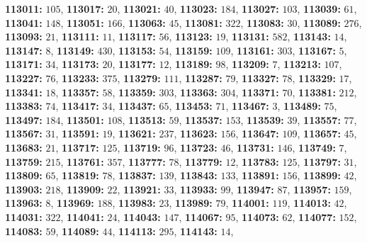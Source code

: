 \textsf{\bfseries 113011:} $105$, \textsf{\bfseries 113017:} $20$, \textsf{\bfseries 113021:} $40$, \textsf{\bfseries 113023:} $184$, \textsf{\bfseries 113027:} $103$, \textsf{\bfseries 113039:} $61$, \textsf{\bfseries 113041:} $148$, \textsf{\bfseries 113051:} $166$, \textsf{\bfseries 113063:} $45$, \textsf{\bfseries 113081:} $322$, \textsf{\bfseries 113083:} $30$, \textsf{\bfseries 113089:} $276$, \textsf{\bfseries 113093:} $21$, \textsf{\bfseries 113111:} $11$, \textsf{\bfseries 113117:} $56$, \textsf{\bfseries 113123:} $19$, \textsf{\bfseries 113131:} $582$, \textsf{\bfseries 113143:} $14$, \textsf{\bfseries 113147:} $8$, \textsf{\bfseries 113149:} $430$, \textsf{\bfseries 113153:} $54$, \textsf{\bfseries 113159:} $109$, \textsf{\bfseries 113161:} $303$, \textsf{\bfseries 113167:} $5$, \textsf{\bfseries 113171:} $34$, \textsf{\bfseries 113173:} $20$, \textsf{\bfseries 113177:} $12$, \textsf{\bfseries 113189:} $98$, \textsf{\bfseries 113209:} $7$, \textsf{\bfseries 113213:} $107$, \textsf{\bfseries 113227:} $76$, \textsf{\bfseries 113233:} $375$, \textsf{\bfseries 113279:} $111$, \textsf{\bfseries 113287:} $79$, \textsf{\bfseries 113327:} $78$, \textsf{\bfseries 113329:} $17$, \textsf{\bfseries 113341:} $18$, \textsf{\bfseries 113357:} $58$, \textsf{\bfseries 113359:} $303$, \textsf{\bfseries 113363:} $304$, \textsf{\bfseries 113371:} $70$, \textsf{\bfseries 113381:} $212$, \textsf{\bfseries 113383:} $74$, \textsf{\bfseries 113417:} $34$, \textsf{\bfseries 113437:} $65$, \textsf{\bfseries 113453:} $71$, \textsf{\bfseries 113467:} $3$, \textsf{\bfseries 113489:} $75$, \textsf{\bfseries 113497:} $184$, \textsf{\bfseries 113501:} $108$, \textsf{\bfseries 113513:} $59$, \textsf{\bfseries 113537:} $153$, \textsf{\bfseries 113539:} $39$, \textsf{\bfseries 113557:} $77$, \textsf{\bfseries 113567:} $31$, \textsf{\bfseries 113591:} $19$, \textsf{\bfseries 113621:} $237$, \textsf{\bfseries 113623:} $156$, \textsf{\bfseries 113647:} $109$, \textsf{\bfseries 113657:} $45$, \textsf{\bfseries 113683:} $21$, \textsf{\bfseries 113717:} $125$, \textsf{\bfseries 113719:} $96$, \textsf{\bfseries 113723:} $46$, \textsf{\bfseries 113731:} $146$, \textsf{\bfseries 113749:} $7$, \textsf{\bfseries 113759:} $215$, \textsf{\bfseries 113761:} $357$, \textsf{\bfseries 113777:} $78$, \textsf{\bfseries 113779:} $12$, \textsf{\bfseries 113783:} $125$, \textsf{\bfseries 113797:} $31$, \textsf{\bfseries 113809:} $65$, \textsf{\bfseries 113819:} $78$, \textsf{\bfseries 113837:} $139$, \textsf{\bfseries 113843:} $133$, \textsf{\bfseries 113891:} $156$, \textsf{\bfseries 113899:} $42$, \textsf{\bfseries 113903:} $218$, \textsf{\bfseries 113909:} $22$, \textsf{\bfseries 113921:} $33$, \textsf{\bfseries 113933:} $99$, \textsf{\bfseries 113947:} $87$, \textsf{\bfseries 113957:} $159$, \textsf{\bfseries 113963:} $8$, \textsf{\bfseries 113969:} $188$, \textsf{\bfseries 113983:} $23$, \textsf{\bfseries 113989:} $79$, \textsf{\bfseries 114001:} $119$, \textsf{\bfseries 114013:} $42$, \textsf{\bfseries 114031:} $322$, \textsf{\bfseries 114041:} $24$, \textsf{\bfseries 114043:} $147$, \textsf{\bfseries 114067:} $95$, \textsf{\bfseries 114073:} $62$, \textsf{\bfseries 114077:} $152$, \textsf{\bfseries 114083:} $59$, \textsf{\bfseries 114089:} $44$, \textsf{\bfseries 114113:} $295$, \textsf{\bfseries 114143:} $14$, 

